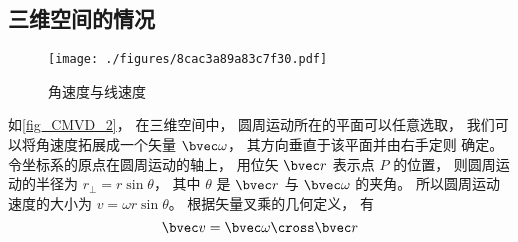 \subsection{三维空间的情况}\label{sub_CMVD_1}

\begin{figure}[ht]
\centering
\texttt{[image: ./figures/8cac3a89a83c7f30.pdf]}
\caption{角速度与线速度} \label{fig_CMVD_2}
\end{figure}

如\autoref{fig_CMVD_2}， 在三维空间中， 圆周运动所在的平面可以任意选取， 我们可以将角速度拓展成一个矢量 $\bvec\omega$， 其方向垂直于该平面并由右手定则 确定。 令坐标系的原点在圆周运动的轴上， 用位矢 $\bvec r$ 表示点 $P$ 的位置， 则圆周运动的半径为 $r_\bot = r \sin\theta$， 其中 $\theta$ 是 $\bvec r$ 与 $\bvec \omega$ 的夹角。 所以圆周运动速度的大小为 $v = \omega r \sin\theta$。 根据矢量叉乘的几何定义， 有
\begin{equation}\label{eq_CMVD_5}
\bvec v = \bvec\omega \cross \bvec r
\end{equation}

